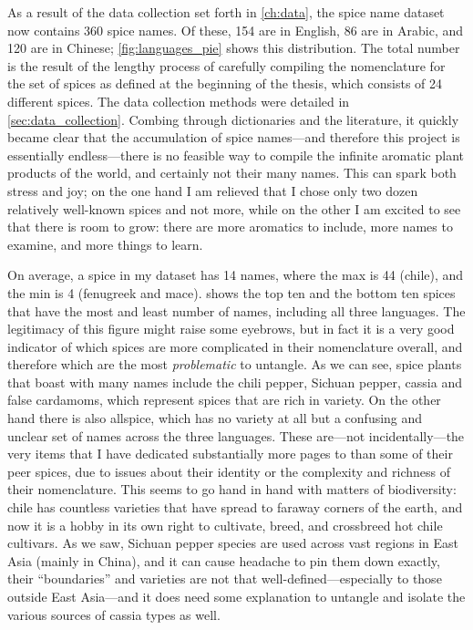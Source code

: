 As a result of the data collection set forth in \cref{ch:data}, the spice name dataset now contains 360 spice names. Of these, 154 are in English, 86 are in Arabic, and 120 are in Chinese; \cref{fig:languages_pie} shows this distribution.
The total number is the result of the lengthy process of carefully compiling the nomenclature for the set of spices as defined at the beginning of the thesis, which consists of 24 different spices. The data collection methods were detailed in \cref{sec:data_collection}. Combing through dictionaries and the literature, it quickly became clear that the accumulation of spice names---and therefore this project is essentially endless---there is no feasible way to compile the infinite aromatic plant products of the world, and certainly not their many names. This can spark both stress and joy; on the one hand I am relieved that I chose only two dozen relatively well-known spices and not more, while on the other I am excited to see that there is room to grow: there are more aromatics to include, more names to examine, and more things to learn.
 
On average, a spice in my dataset has 14 names, where the max is 44 (chile), and the min is 4 (fenugreek and mace).  shows the top ten and the bottom ten spices that have the most and least number of names, including all three languages. The legitimacy of this figure might raise some eyebrows, but in fact it is a very good indicator of which spices are more complicated in their nomenclature overall, and therefore which are the most \textit{problematic} to untangle. As we can see, spice plants that boast with many names include the chili pepper, Sichuan pepper, cassia and false cardamoms, which represent spices that are rich in variety. On the other hand there is also allspice, which has no variety at all but a confusing and unclear set of names across the three languages. These are---not incidentally---the very items that I have dedicated substantially more pages to than some of their peer spices, due to issues about their identity or the complexity and richness of their nomenclature. This seems to go hand in hand with matters of biodiversity: chile has countless varieties that have spread to faraway corners of the earth, and now it is a hobby in its own right to cultivate, breed, and crossbreed hot chile cultivars. As we saw, Sichuan pepper species are used across vast regions in East Asia (mainly in China), and it can cause headache to pin them down exactly, their ``boundaries'' and varieties are not that well-defined---especially to those outside East Asia---and it does need some explanation to untangle and isolate the various sources of cassia types as well.

